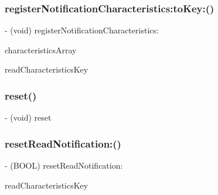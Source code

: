 \hypertarget{interfaceARSAL__BLEManager_a2bfe42d81086019fc3f10c640a8ea14a}{}\label{interfaceARSAL__BLEManager_a2bfe42d81086019fc3f10c640a8ea14a} 
\subsubsection{\texorpdfstring{register\+Notification\+Characteristics\+:to\+Key\+:()}{registerNotificationCharacteristics:toKey:()}}
{\footnotesize\ttfamily -\/ (void) register\+Notification\+Characteristics\+: \begin{DoxyParamCaption}\item[{(N\+S\+Array $\ast$)}]{characteristics\+Array }\item[{toKey:(N\+S\+String $\ast$)}]{read\+Characteristics\+Key }\end{DoxyParamCaption}}

\hypertarget{interfaceARSAL__BLEManager_aa7bfd6655251871a975263ff249b2074}{}\label{interfaceARSAL__BLEManager_aa7bfd6655251871a975263ff249b2074} 
\subsubsection{\texorpdfstring{reset()}{reset()}}
{\footnotesize\ttfamily -\/ (void) reset \begin{DoxyParamCaption}{ }\end{DoxyParamCaption}}

\hypertarget{interfaceARSAL__BLEManager_a35c00081083a3cf9716ebfc73adbaeec}{}\label{interfaceARSAL__BLEManager_a35c00081083a3cf9716ebfc73adbaeec} 
\subsubsection{\texorpdfstring{reset\+Read\+Notification\+:()}{resetReadNotification:()}}
{\footnotesize\ttfamily -\/ (B\+O\+OL) reset\+Read\+Notification\+: \begin{DoxyParamCaption}\item[{(N\+S\+String $\ast$)}]{read\+Characteristics\+Key }\end{DoxyParamCaption}}

